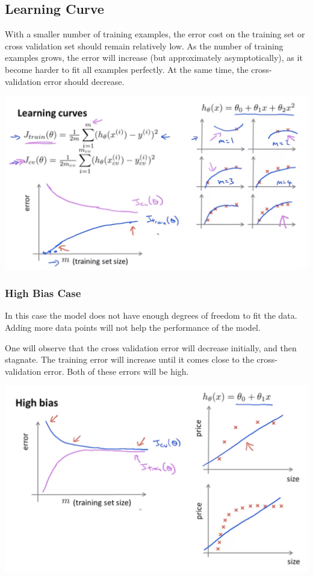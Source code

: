\subsection{Learning Curve}

With a smaller number of training examples, the error cost on the training set or cross validation set should remain relatively low. As the number of training examples grows, the error will increase (but approximately asymptotically), as it become harder to fit all examples perfectly. At the same time, the cross-validation error should decrease.

\includegraphics[width=0.9\columnwidth]{ml_figures/learning_curve.png}

\subsubsection{High Bias Case}

In this case the model does not have enough degrees of freedom to fit the data. Adding more data points will not help the performance of the model. 

One will observe that the cross validation error will decrease initially, and then stagnate. 
The training error will increase until it comes close to the cross-validation error.
Both of these errors will be high.

\includegraphics[width=0.9\columnwidth]{ml_figures/learning_curve_bias.png} 

